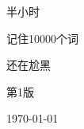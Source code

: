 \begin{titlepage}
    \centering
    \vspace*{0.5cm}
    
    {\fontsize{80}{80}\selectfont\songti 半小时 \par}
    \vspace{0.1cm} %
    
    {\fontsize{65}{65}\selectfont\songti 记住10000个词 \par}
    \vspace{1cm} %
    
    {\Large {} 还在尬黑 \par}
    \vspace{0.1cm}
    
    {\Large {} 第1版 \par}
    \vspace{0.1cm}
    
    {\Large {} \today \par}
    \vspace{0.1cm}

\end{titlepage}